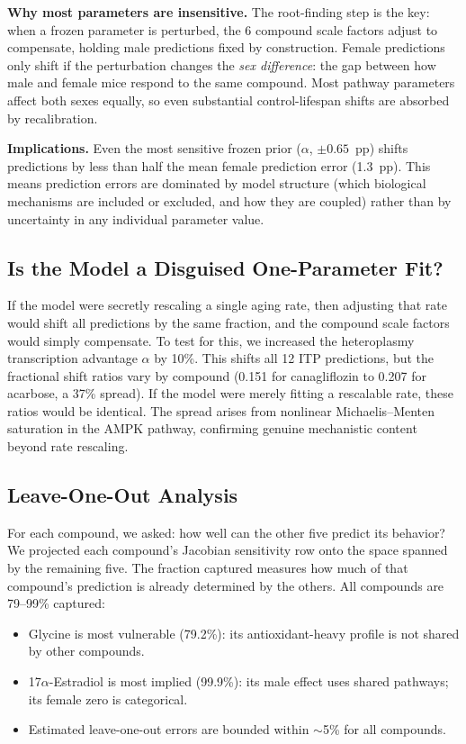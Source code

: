 \documentclass[11pt]{article}
\begin{document}
\textbf{Why most parameters are insensitive.} The root-finding step is the key: when a frozen parameter is perturbed, the 6 compound scale factors adjust to compensate, holding male predictions fixed by construction. Female predictions only shift if the perturbation changes the \emph{sex difference}: the gap between how male and female mice respond to the same compound. Most pathway parameters affect both sexes equally, so even substantial control-lifespan shifts are absorbed by recalibration.

\textbf{Implications.} Even the most sensitive frozen prior ($\alpha$, $\pm 0.65$~pp) shifts predictions by less than half the mean female prediction error (1.3~pp). This means prediction errors are dominated by model structure (which biological mechanisms are included or excluded, and how they are coupled) rather than by uncertainty in any individual parameter value.

\subsection{Is the Model a Disguised One-Parameter Fit?}

If the model were secretly rescaling a single aging rate, then adjusting that rate would shift all predictions by the same fraction, and the compound scale factors would simply compensate. To test for this, we increased the heteroplasmy transcription advantage $\alpha$ by 10\%. This shifts all 12 ITP predictions, but the fractional shift ratios vary by compound (0.151 for canagliflozin to 0.207 for acarbose, a 37\% spread). If the model were merely fitting a rescalable rate, these ratios would be identical. The spread arises from nonlinear Michaelis--Menten saturation in the AMPK pathway, confirming genuine mechanistic content beyond rate rescaling.

\subsection{Leave-One-Out Analysis}

For each compound, we asked: how well can the other five predict its behavior? We projected each compound's Jacobian sensitivity row onto the space spanned by the remaining five. The fraction captured measures how much of that compound's prediction is already determined by the others. All compounds are 79--99\% captured:

\begin{itemize}
\item Glycine is most vulnerable (79.2\%): its antioxidant-heavy profile is not shared by other compounds.
\item 17$\alpha$-Estradiol is most implied (99.9\%): its male effect uses shared pathways; its female zero is categorical.
\item Estimated leave-one-out errors are bounded within $\sim$5\% for all compounds.
\end{itemize}
\end{document}
